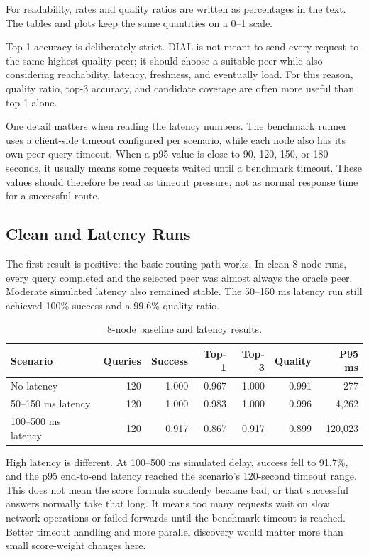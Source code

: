 For readability, rates and quality ratios are written as percentages in the
text. The tables and plots keep the same quantities on a 0--1 scale.

Top-1 accuracy is deliberately strict. DIAL is not meant to send every request
to the same highest-quality peer; it should choose a suitable peer while also
considering reachability, latency, freshness, and eventually load. For this
reason, quality ratio, top-3 accuracy, and candidate coverage are often more
useful than top-1 alone.

One detail matters when reading the latency numbers. The benchmark runner uses
a client-side timeout configured per scenario, while each node also has its own
peer-query timeout. When a p95 value is close to 90, 120, 150, or 180 seconds,
it usually means some requests waited until a benchmark timeout. These values
should therefore be read as timeout pressure, not as normal response time for a
successful route.

\subsection{Clean and Latency Runs}

The first result is positive: the basic routing path works. In clean 8-node
runs, every query completed and the selected peer was almost always the oracle
peer. Moderate simulated latency also remained stable. The 50--150 ms latency
run still achieved 100\% success and a 99.6\% quality ratio.

\begin{table}[H]
\centering
\caption{8-node baseline and latency results.}
\begin{tabular}{lrrrrrr}
\toprule
\textbf{Scenario} & \textbf{Queries} & \textbf{Success} & \textbf{Top-1} & \textbf{Top-3} & \textbf{Quality} & \textbf{P95 ms} \\
\midrule
No latency & 120 & 1.000 & 0.967 & 1.000 & 0.991 & 277 \\
50--150 ms latency & 120 & 1.000 & 0.983 & 1.000 & 0.996 & 4,262 \\
100--500 ms latency & 120 & 0.917 & 0.867 & 0.917 & 0.899 & 120,023 \\
\bottomrule
\end{tabular}
\end{table}

High latency is different. At 100--500 ms simulated delay, success fell to
91.7\%, and the p95 end-to-end latency reached the scenario's 120-second
timeout range. This does not mean the score formula suddenly became bad, or
that successful answers normally take that long. It means too many requests
wait on slow network operations or failed forwards until the benchmark timeout
is reached. Better timeout handling and more parallel discovery would matter
more than small score-weight changes here.

